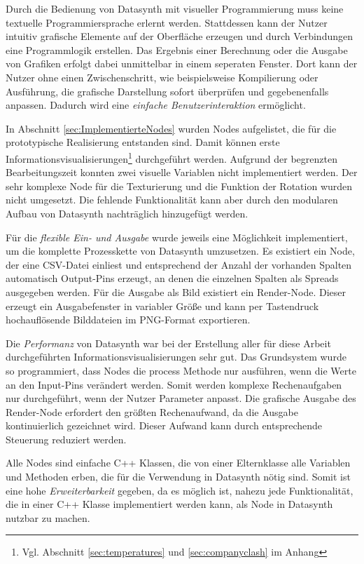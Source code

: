\documentclass[a4paper, 
               12pt,
               DIV=calc,
               version=first,
               pdftex,
               headsepline,
               footsepline,
               bibtotocnumbered,
               liststotocnumbered]{scrreprt}
\begin{document}
Durch die Bedienung von Datasynth mit visueller Programmierung muss keine
textuelle Programmiersprache erlernt werden. Stattdessen kann der Nutzer intuitiv
grafische Elemente auf der Oberfläche erzeugen und durch Verbindungen
eine Programmlogik erstellen. Das Ergebnis einer Berechnung oder die Ausgabe von
Grafiken erfolgt dabei unmittelbar in einem seperaten Fenster. Dort kann der Nutzer
ohne einen Zwischenschritt, wie beispielsweise Kompilierung oder Ausführung,
die grafische Darstellung sofort überprüfen und gegebenenfalls anpassen. Dadurch wird eine
\textit{einfache Benutzerinteraktion} ermöglicht.

In Abschnitt \ref{sec:ImplementierteNodes} wurden Nodes aufgelistet,
die für die prototypische Realisierung entstanden sind. Damit können erste Informationsvisualisierungen\footnote{Vgl. Abschnitt
\ref{sec:temperatures} und \ref{sec:companyclash} im Anhang} durchgeführt werden.
Aufgrund der begrenzten Bearbeitungszeit konnten zwei visuelle
Variablen nicht implementiert werden. Der sehr komplexe Node für die Texturierung
und die Funktion der Rotation wurden nicht umgesetzt. Die fehlende Funktionalität kann aber
durch den modularen Aufbau von Datasynth nachträglich hinzugefügt werden.

Für die \textit{flexible Ein- und Ausgabe} wurde jeweils eine Möglichkeit implementiert, um die komplette
Prozesskette von Datasynth umzusetzen. Es existiert ein Node, der eine
CSV-Datei einliest und entsprechend der Anzahl der vorhanden
Spalten automatisch Output-Pins erzeugt, an denen die einzelnen Spalten als
Spreads ausgegeben werden. Für die Ausgabe als Bild existiert ein Render-Node.
Dieser erzeugt ein Ausgabefenster in variabler Größe und kann per Tastendruck
hochauflösende Bilddateien im PNG-Format exportieren.

Die \textit{Performanz} von Datasynth war bei der Erstellung aller für diese Arbeit durchgeführten
Informationsvisualisierungen sehr gut. Das Grundsystem wurde so
programmiert, dass Nodes die process Methode nur ausführen, wenn die Werte
an den Input-Pins verändert werden. Somit werden komplexe Rechenaufgaben nur
durchgeführt, wenn der Nutzer Parameter anpasst. Die grafische Ausgabe
des Render-Node erfordert den größten Rechenaufwand, da die Ausgabe kontinuierlich
gezeichnet wird. Dieser Aufwand kann durch entsprechende Steuerung
reduziert werden.

Alle Nodes sind einfache C++ Klassen, die von einer Elternklasse
alle Variablen und Methoden erben, die für die Verwendung in Datasynth
nötig sind. Somit ist eine hohe \textit{Erweiterbarkeit} gegeben, da es möglich ist,
nahezu jede Funktionalität, die in einer C++ Klasse implementiert werden kann,
als Node in Datasynth nutzbar zu machen.
\end{document}
